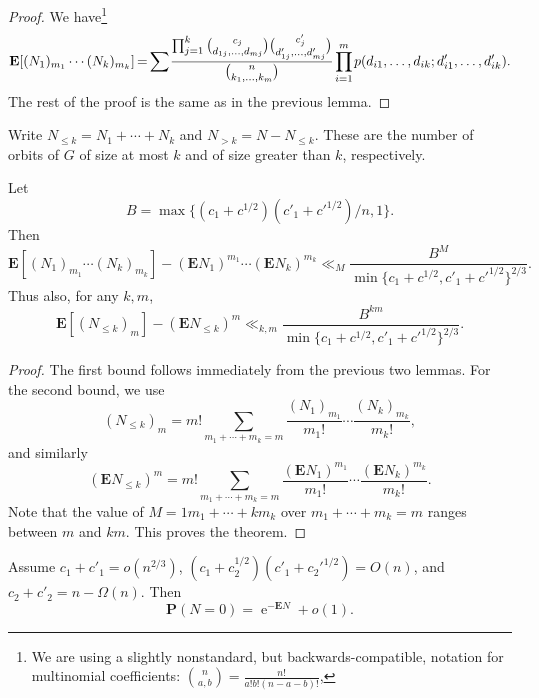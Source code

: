 \documentclass[ALCO,ThmDefs,Unicode,epreuves]{cedram}
\DeclareMathOperator{\expe}{e}
\renewcommand\P{\mathbf{P}}
\newcommand\E{\mathbf{E}}
\newcommand*{\mk}{\mkern -1mu}
\newcommand*{\Mk}{\mkern -2mu}
\begin{document}
\begin{proof}
We have\footnote{We are using a slightly nonstandard, but backwards-compatible, notation for multinomial coefficients: $\binom{n}{a, b} = \frac{n!}{a!b!(n-a-b)!}$, \etc}
\begin{equation*}
 \E[(N_1)_{m_1} \cdots (N_k)_{m_k}] %
 \Mk = \Mk \sum \Mk \frac{\prod_{j=1}^{k} \binom{c_j}{d_{1j}, \dots, d_{mj}} \binom{c'_j}{d'_{1j}, \dots, d'_{mj}}}
 {\binom{n}{k_1, \dots, k_m}}
 \mk \prod_{i=1}^m \mk p(d_{i1}, \dots, d_{ik} ; d'_{i1}, \dots, d'_{ik}).
\end{equation*}
The rest of the proof is the same as in the previous lemma.
\end{proof}

Write $N_{\leq k} = N_1 + \cdots + N_k$ and $N_{>k} = N - N_{\leq k}$.
These are the number of orbits of $G$ of size at most $k$ and of size greater than $k$, respectively.

\begin{theorem} \label{thm:poisson-approximation}
Let
\[
 B = \max \{(c_1 + c^{1/2}) (c'_1 + {c'}^{1/2}) / n, 1\}.
\]
Then
\[
 \E[(N_1)_{m_1} \cdots (N_k)_{m_k}] - (\E N_1)^{m_1} \cdots (\E N_k)^{m_k}
 \ll_M
 \frac{B^M}{\min\{c_1 + c^{1/2}, c'_1 + {c'}^{1/2}\}^{2/3}}.
\]
Thus also, for any $k,m$,
\[
\E[(N_{\leq k})_m] - (\E N_{\leq k})^m 
 \ll_{k,m}
 \frac{B^{km}}{\min\{c_1 + c^{1/2}, c'_1 + {c'}^{1/2}\}^{2/3}}
 .
\]
\end{theorem}

\begin{proof}
The first bound follows immediately from the previous two lemmas. For the second bound, we use
\[
 (N_{\leq k})_m = m! \sum_{m_1 + \cdots + m_k = m} \frac{(N_1)_{m_1}}{m_1!} \cdots \frac{(N_k)_{m_k}}{m_k!},
\]
and similarly
\[
 (\E N_{\leq k})^m = m! \sum_{m_1 + \cdots + m_k = m} \frac{(\E N_1)^{m_1}}{m_1!} \cdots \frac{(\E N_k)^{m_k}}{m_k!}.
\]
Note that the value of
$
 M = 1 m_1 + \cdots + k m_k
$
over
$
 m_1 + \cdots + m_k = m
$
ranges between $m$ and $km$. This proves the theorem.
\end{proof}

\begin{theorem}
Assume $c_1 + c'_1 = o(n^{2/3})$, $(c_1 + c_2^{1/2}) (c'_1 + {c_2'}^{1/2}) = O(n)$, and $c_2 + c'_2 = n - \Omega(n)$. Then 
\[
 \P(N = 0) = \expe^{-\E N} + o(1).
\]
\end{theorem}
\end{document}
